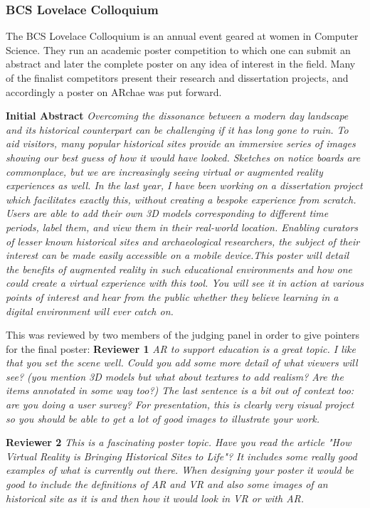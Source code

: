 \documentclass{article}
\begin{document}
\subsubsection{BCS Lovelace Colloquium}
The BCS Lovelace Colloquium is an annual event geared at women in Computer Science. They run an academic poster competition to which one can submit an abstract and later the complete poster on any idea of interest in the field. Many of the finalist competitors present their research and dissertation projects, and accordingly a poster on ARchae was put forward. 

\textbf{Initial Abstract} \textit{Overcoming the dissonance between a modern day landscape and its historical counterpart can be challenging if it has long gone to ruin. To aid visitors, many popular historical sites provide an immersive series of images showing our best guess of how it would have looked. Sketches on notice boards are commonplace, but we are increasingly seeing virtual or augmented reality experiences as well. In the last year, I have been working on a dissertation project which facilitates exactly this, without creating a bespoke experience from scratch. Users are able to add their own 3D models corresponding to different time periods, label them, and view them in their real-world location. Enabling curators of lesser known historical sites and archaeological researchers, the subject of their interest can be made easily accessible on a mobile device.This poster will detail the benefits of augmented reality in such educational environments and how one could create a virtual experience with this tool. You will see it in action at various points of interest and hear from the public whether they believe learning in a digital environment will ever catch on.}

This was reviewed by two members of the judging panel in order to give pointers for the final poster:
\textbf{Reviewer 1}
\textit{AR to support education is a great topic. I like that you set the scene well. Could you add some more detail of what viewers will see? (you mention 3D models but what about textures to add realism? Are the items annotated in some way too?) The last sentence is a bit out of context too: are you doing a user survey? For presentation, this is clearly very visual project so you should be able to get a lot of good images to illustrate your work.}

\textbf{Reviewer 2}
\textit{This is a fascinating poster topic. Have you read the article "How Virtual Reality is Bringing Historical Sites to Life"? It includes some really good examples of what is currently out there. When designing your poster it would be good to include the definitions of AR and VR and also some images of an historical site as it is and then how it would look in VR or with AR.}
\end{document}

